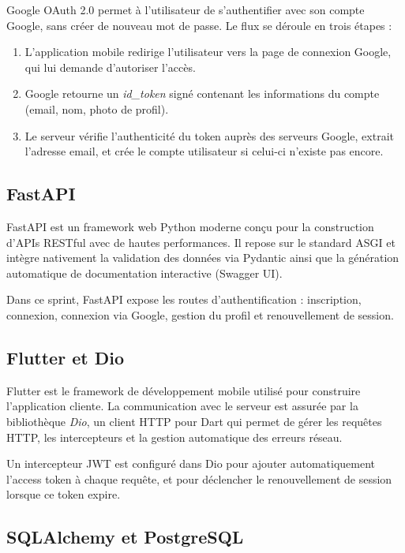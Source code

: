 Google OAuth 2.0 permet à l'utilisateur de s'authentifier avec son compte Google, sans créer de nouveau mot de passe. Le flux se déroule en trois étapes :
\begin{enumerate}
    \item L'application mobile redirige l'utilisateur vers la page de connexion Google, qui lui demande d'autoriser l'accès.
    \item Google retourne un \textit{id\_token} signé contenant les informations du compte (email, nom, photo de profil).
    \item Le serveur vérifie l'authenticité du token auprès des serveurs Google, extrait l'adresse email, et crée le compte utilisateur si celui-ci n'existe pas encore.
\end{enumerate}

\subsection{FastAPI}

FastAPI est un framework web Python moderne conçu pour la construction d'APIs RESTful avec de hautes performances. Il repose sur le standard ASGI et intègre nativement la validation des données via Pydantic ainsi que la génération automatique de documentation interactive (Swagger UI).

Dans ce sprint, FastAPI expose les routes d'authentification : inscription, connexion, connexion via Google, gestion du profil et renouvellement de session.

\subsection{Flutter et Dio}

Flutter est le framework de développement mobile utilisé pour construire l'application cliente. La communication avec le serveur est assurée par la bibliothèque \textit{Dio}, un client HTTP pour Dart qui permet de gérer les requêtes HTTP, les intercepteurs et la gestion automatique des erreurs réseau.

Un intercepteur JWT est configuré dans Dio pour ajouter automatiquement l'access token à chaque requête, et pour déclencher le renouvellement de session lorsque ce token expire.

\subsection{SQLAlchemy et PostgreSQL}

